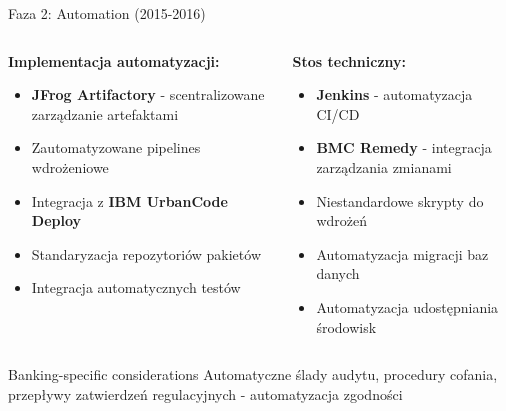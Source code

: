 \documentclass[10pt, aspectratio=169]{beamer}
\begin{document}
\begin{frame}{Faza 2: Automation (2015-2016)}
\begin{columns}[T]
\begin{column}{0.5\textwidth}
\textbf{Implementacja automatyzacji:}
\begin{itemize}
\item \textbf{JFrog Artifactory} - scentralizowane zarządzanie artefaktami
\item Zautomatyzowane pipelines wdrożeniowe
\item Integracja z \textbf{IBM UrbanCode Deploy}
\item Standaryzacja repozytoriów pakietów
\item Integracja automatycznych testów
\end{itemize}
\end{column}
\begin{column}{0.5\textwidth}
\textbf{Stos techniczny:}
\begin{itemize}
\item \textbf{Jenkins} - automatyzacja CI/CD
\item \textbf{BMC Remedy} - integracja zarządzania zmianami
\item Niestandardowe skrypty do wdrożeń
\item Automatyzacja migracji baz danych
\item Automatyzacja udostępniania środowisk
\end{itemize}
\end{column}
\end{columns}

\begin{block}{Banking-specific considerations}
Automatyczne ślady audytu, procedury cofania, przepływy zatwierdzeń regulacyjnych - automatyzacja zgodności
\end{block}
\end{frame}
\end{document}
